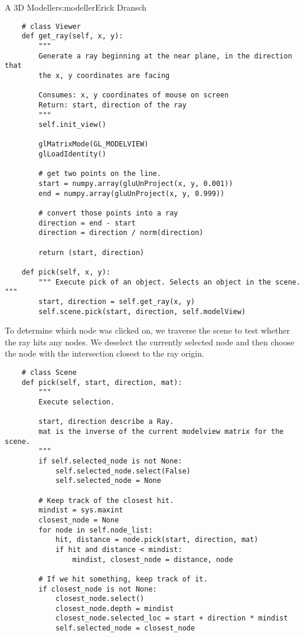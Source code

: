 \begin{aosachapter}{A 3D Modeller}{s:modeller}{Erick Dransch}
\begin{verbatim}
    # class Viewer
    def get_ray(self, x, y):
        """ 
        Generate a ray beginning at the near plane, in the direction that
        the x, y coordinates are facing 

        Consumes: x, y coordinates of mouse on screen 
        Return: start, direction of the ray 
        """
        self.init_view()
    
        glMatrixMode(GL_MODELVIEW)
        glLoadIdentity()
    
        # get two points on the line.
        start = numpy.array(gluUnProject(x, y, 0.001))
        end = numpy.array(gluUnProject(x, y, 0.999))
    
        # convert those points into a ray
        direction = end - start
        direction = direction / norm(direction)
    
        return (start, direction)
    
    def pick(self, x, y):
        """ Execute pick of an object. Selects an object in the scene. """
        start, direction = self.get_ray(x, y)
        self.scene.pick(start, direction, self.modelView)
\end{verbatim}

To determine which node was clicked on, we traverse the scene to test
whether the ray hits any nodes. We deselect the currently selected node
and then choose the node with the intersection closest to the ray
origin.

\begin{verbatim}
    # class Scene
    def pick(self, start, direction, mat):
        """ 
        Execute selection.
            
        start, direction describe a Ray. 
        mat is the inverse of the current modelview matrix for the scene.
        """
        if self.selected_node is not None:
            self.selected_node.select(False)
            self.selected_node = None
    
        # Keep track of the closest hit.
        mindist = sys.maxint
        closest_node = None
        for node in self.node_list:
            hit, distance = node.pick(start, direction, mat)
            if hit and distance < mindist:
                mindist, closest_node = distance, node
    
        # If we hit something, keep track of it.
        if closest_node is not None:
            closest_node.select()
            closest_node.depth = mindist
            closest_node.selected_loc = start + direction * mindist
            self.selected_node = closest_node
\end{verbatim}


\end{aosachapter}
